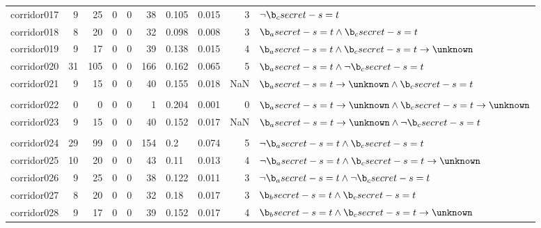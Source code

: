 \begin{tabular}{lrrrrrllrl}
corridor017 & 9 & 25 & 0 & 0 & 38 & 0.105 & 0.015 & 3 & $\neg \b_c secret-s=t $ \\%
corridor018 & 8 & 20 & 0 & 0 & 32 & 0.098 & 0.008 & 3 & $\b_a secret-s=t \land \b_c secret-s=t $ \\%
corridor019 & 9 & 17 & 0 & 0 & 39 & 0.138 & 0.015 & 4 & $\b_a secret-s=t \land \b_c secret-s=t  \rightarrow \unknown $ \\%
corridor020 & 31 & 105 & 0 & 0 & 166 & 0.162 & 0.065 & 5 & $\b_a secret-s=t \land \neg \b_c secret-s=t $ \\%
corridor021 & 9 & 15 & 0 & 0 & 40 & 0.155 & 0.018 & NaN & $\b_a secret-s=t  \rightarrow \unknown \land \b_c secret-s=t $ \\ \\
corridor022 & 0 & 0 & 0 & 0 & 1 & 0.204 & 0.001 & 0 & $\b_a secret-s=t  \rightarrow \unknown \land \b_c secret-s=t  \rightarrow \unknown $ \\%
corridor023 & 9 & 15 & 0 & 0 & 40 & 0.152 & 0.017 & NaN & $\b_a secret-s=t  \rightarrow \unknown \land \neg \b_c secret-s=t $ \\ \\
corridor024 & 29 & 99 & 0 & 0 & 154 & 0.2 & 0.074 & 5 & $\neg \b_a secret-s=t \land \b_c secret-s=t $ \\%
corridor025 & 10 & 20 & 0 & 0 & 43 & 0.11 & 0.013 & 4 & $\neg \b_a secret-s=t \land \b_c secret-s=t  \rightarrow \unknown $ \\%
corridor026 & 9 & 25 & 0 & 0 & 38 & 0.122 & 0.011 & 3 & $\neg \b_a secret-s=t \land \neg \b_c secret-s=t $ \\%
corridor027 & 8 & 20 & 0 & 0 & 32 & 0.18 & 0.017 & 3 & $\b_b secret-s=t \land \b_c secret-s=t $ \\%
corridor028 & 9 & 17 & 0 & 0 & 39 & 0.152 & 0.017 & 4 & $\b_b secret-s=t \land \b_c secret-s=t  \rightarrow \unknown $ \\%

\end{tabular}
